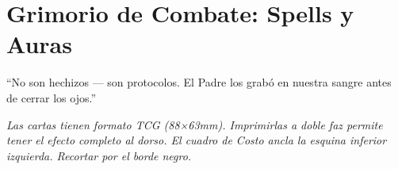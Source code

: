 
\cleardoublepage
\chapter{Grimorio de Combate: Spells y Auras}

\begin{loreblock}
``No son hechizos — son protocolos. El Padre los grabó en nuestra sangre antes de cerrar los ojos.''
\end{loreblock}

\vspace{0.3cm}
\textit{Las cartas tienen formato TCG (88×63mm). Imprimirlas a doble faz permite tener el efecto completo al dorso. El cuadro de Costo ancla la esquina inferior izquierda. Recortar por el borde negro.}

\vspace{0.5cm}

